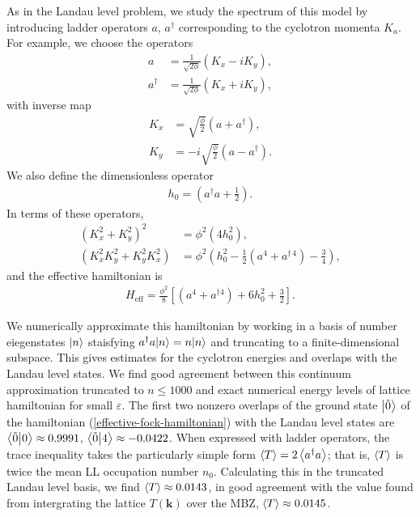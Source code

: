 \documentclass[aps,prb,twocolumn,letterpaper,twoside,nobalancelastpage,groupedaddress,amsmath,amssymb,floatfix,citeautoscript]{revtex4-1}
\begin{document}
As in the Landau level problem, we study the spectrum of this model by introducing ladder operators $a$, $a^{\dag}$ corresponding to the cyclotron momenta $K_a$. For example, we choose the operators
\begin{align*}
a &= \frac{1}{\sqrt{2\phi}}\left(K_x - iK_y\right),\\
a^{\dag} &= \frac{1}{\sqrt{2\phi}}\left(K_x + iK_y\right),
\end{align*}
with inverse map
\begin{align*}
K_x &= \sqrt{\frac{\phi}{2}}\left(a + a^{\dag}\right),\\
K_y &= -i\sqrt{\frac{\phi}{2}}\left(a - a^{\dag}\right).
\end{align*}
We also define the dimensionless operator
\begin{align*}
h_0 = \left(a^{\dag}a + \frac{1}{2}\right).
\end{align*}
In terms of these operators,
\begin{align*}
\left(K_x^2 + K_y^2\right)^2 &= \phi^2\left(4 h_0^2\right), \\
\left(K_x^2K_y^2 + K_y^2K_x^2\right) &= \phi^2\left(h_0^2 -\frac{1}{2}\left(a^4 + a^{\dag\,4}\right) - \frac{3}{4}\right),
\end{align*}
and the effective hamiltonian is
\begin{align}
\label{effective-fock-hamiltonian}
H_{\text{eff}} = \frac{\phi^2}{8}\left[\left(a^4 + a^{\dag 4}\right) + 6h_0^2 + \frac{3}{2}\right].
\end{align}

We numerically approximate this hamiltonian by working in a basis of number eiegenstates $\ket{n}$ staisfying $a^{\dag}a{\ket{n}}=n{\ket{n}}$ and truncating to a finite-dimensional subspace. This gives estimates for the cyclotron energies and overlaps with the Landau level states. We find good agreement between this continuum approximation truncated to $n \leq 1000$ and exact numerical energy levels of lattice hamiltonian for small $\varepsilon$. The first two nonzero overlaps of the ground state $\ket{\tilde{0}}$ of the hamiltonian (\ref{effective-fock-hamiltonian}) with the Landau level states are $\braket{\tilde{0}}{0}\approx0.9991$, $\braket{\tilde{0}}{4}\approx-0.0422$. When expressed with ladder operators, the trace inequality takes the particularly simple form $\expval{T} = 2\expval{a^{\dag}a}$\cite{bauer_quantum_2016}; that is, $\expval{T}$ is twice the mean LL occupation number $n_0$. Calculating this in the truncated Landau level basis, we find $\expval{T} \approx0.0143$, in good agreement with the value found from intergrating the lattice $T(\mathbf{k})$ over the MBZ, $\expval{T} \approx 0.0145$.
\end{document}
